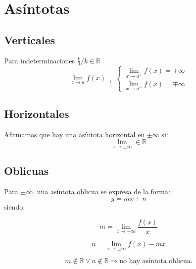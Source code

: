 \documentclass{article}
\theoremstyle{plain}
\begin{document}
\section*{Asíntotas}
\subsection*{Verticales}
Para indeterminaciones $ \frac{k}{0}/k \in \mathbb{R}$ 
\[
    \lim_{x \to a} f(x) \underset{\frac{k}{0}}{=} \left\{\begin{matrix}
    \lim_{x \to a^+} f(x)=\pm \infty \\ 
    \lim_{x \to a^-} f(x)=\mp \infty
    \end{matrix}\right.
\]

\subsection*{Horizontales}
Afirmamos que hay una asíntota horizontal en $\pm\infty$ si:
\[
    \lim_{x \to \pm\infty} \in \mathbb{R}
\] 

\subsection*{Oblicuas}
Para $\pm \infty$, una asíntota oblicua se expresa de la forma:
\[
    y=mx+n
\] 
siendo:

\noindent\begin{minipage}{.5\linewidth}
    \begin{equation*}
        m = \lim_{x \to \pm \infty} \frac{f(x)}{x}
    \end{equation*}
    \end{minipage}%
    \begin{minipage}{.5\linewidth}
    \begin{equation*}
        n = \lim_{x \to \pm \infty} f(x) -mx
    \end{equation*}
    \end{minipage}
\[
    m\not \in \mathbb{R} \vee n\not \in \mathbb{R} \Rightarrow \text{no hay asíntota oblicua.}
\]
\end{document}
